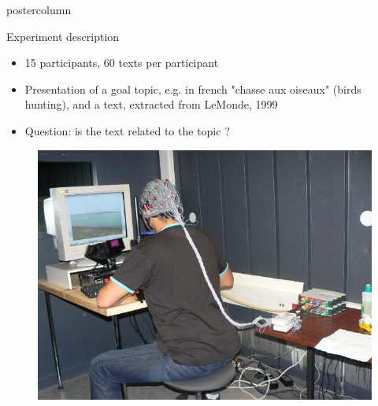 \documentclass[final,hyperref={pdfpagelabels=false}]{beamer}
\newlength{\columnheight}
\begin{document}
\begin{frame}
  \begin{columns}
    \begin{column}{.50\textwidth}
      \begin{beamercolorbox}[center,wd=\textwidth]{postercolumn}
        \begin{minipage}[T]{.98\textwidth}  %
          \parbox[t][\columnheight]{\textwidth}{ %
            \begin{block}{Experiment description}
                \begin{itemize}
                    \item[\bullet] 15 participants, 60 texts per participant
                    \item[\bullet] Presentation of a goal topic, e.g. in french "chasse aux oiseaux" (birds hunting), and a text, extracted from LeMonde, 1999
                    \item[\bullet] Question: is the text related to the topic ?
                \end{itemize}
                \begin{minipage}{0.47\textwidth}
                    \begin{figure}[h]
                        \centering
                        \includegraphics[width=18cm]{efrp.jpg}

\end{figure}
\end{minipage}
\end{block}}
\end{minipage}
\end{beamercolorbox}
\end{column}
\end{columns}
\end{frame}
\end{document}
